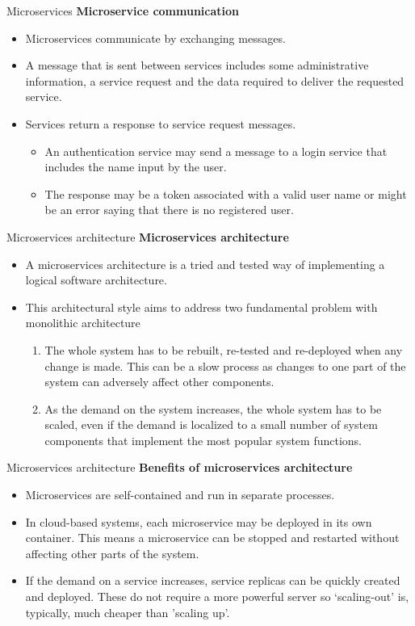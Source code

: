 \documentclass{beamer}
\begin{document}
\begin{frame}{Microservices}
	\textbf{Microservice communication}
	\begin{itemize}
		\item Microservices communicate by exchanging messages.	
	    \item A message that is sent between services includes some administrative
		information, a service request and the data required to deliver the
		requested service.
		\item Services return a response to service request messages.
		\begin{itemize}
			\item An authentication service may send a message to a login service that includes
			the name input by the user.
			\item The response may be a token associated with a valid user name or might be an
			error saying that there is no registered user.
		\end{itemize}
	\end{itemize}
\end{frame}
\begin{frame}{Microservices architecture}
	\textbf{Microservices architecture}
	\begin{itemize}
		\item A microservices architecture is a tried and tested way of implementing a logical software architecture.
		\item This architectural style aims to address two fundamental problem with monolithic architecture
		\begin{enumerate}
			\item The whole system has to be rebuilt, re-tested and re-deployed when any
			change is made. This can be a slow process as changes to one part of the
			system can adversely affect other components.
			\item As the demand on the system increases, the whole system has to be scaled,
			even if the demand is localized to a small number of system components that
			implement the most popular system functions.
		\end{enumerate}
	\end{itemize}
\end{frame}
\begin{frame}{Microservices architecture}
	\textbf{Benefits of microservices architecture}
	\begin{itemize}
		\item Microservices are self-contained and run in separate processes.
		\item In cloud-based systems, each microservice may be deployed in its own
		container. This means a microservice can be stopped and restarted
		without affecting other parts of the system.
		\item If the demand on a service increases, service replicas can be quickly
		created and deployed. These do not require a more powerful server so
		‘scaling-out’ is, typically, much cheaper than ’scaling up’.
	\end{itemize}
\end{frame}
\end{document}

